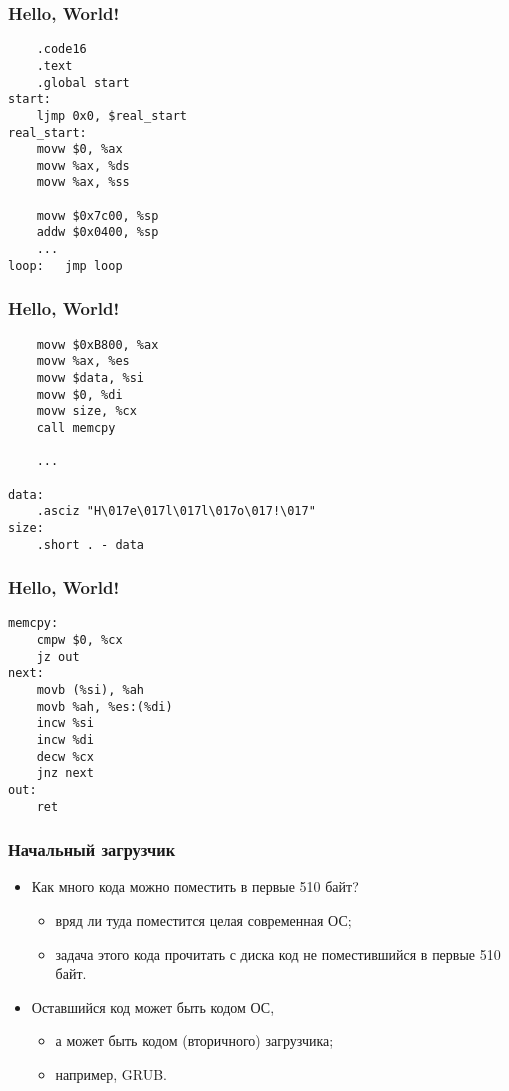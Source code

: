 \begin{frame}[fragile]
\frametitle{Hello, World!}
\begin{lstlisting}
	.code16
	.text
	.global start
start:
	ljmp 0x0, $real_start
real_start:
	movw $0, %ax
	movw %ax, %ds
	movw %ax, %ss

	movw $0x7c00, %sp
	addw $0x0400, %sp
	...
loop:	jmp loop
\end{lstlisting}
\end{frame}

\begin{frame}[fragile]
\frametitle{Hello, World!}
\begin{lstlisting}
	movw $0xB800, %ax
	movw %ax, %es
	movw $data, %si
	movw $0, %di
	movw size, %cx
	call memcpy

	...

data:
	.asciz "H\017e\017l\017l\017o\017!\017"
size:
	.short . - data
\end{lstlisting}
\end{frame}

\begin{frame}[fragile]
\frametitle{Hello, World!}
\begin{lstlisting}
memcpy:
	cmpw $0, %cx
	jz out
next:
	movb (%si), %ah
	movb %ah, %es:(%di)
	incw %si
	incw %di
	decw %cx
	jnz next
out:
	ret
\end{lstlisting}
\end{frame}

\begin{frame}
\frametitle{Начальный загрузчик}
\begin{itemize}
    \item<1->Как много кода можно поместить в первые 510 байт?
    \begin{itemize}
        \item<1-> вряд ли туда поместится целая современная ОС;
        \item<2-> задача этого кода прочитать с диска код не
        поместившийся в первые 510 байт.
    \end{itemize}
    \item<3->Оставшийся код может быть кодом ОС,
    \begin{itemize}
        \item<3->а может быть кодом (вторичного) загрузчика;
        \item<4->например, GRUB.
    \end{itemize}
\end{itemize}
\end{frame}
